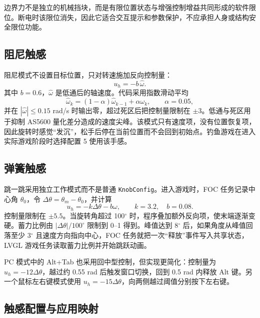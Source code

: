 边界力不是独立的机械挡块，而是有限位置状态与增强控制增益共同形成的软件限位。断电时该限位消失，因此它适合交互提示和参数保护，不应承担人身或结构安全限位功能。

\subsection{阻尼触感}

阻尼模式不设置目标位置，只对转速施加反向控制量：
\begin{equation}
u_h=-b\,\hat{\omega}.
\end{equation}
其中 $b=0.6$，$\hat{\omega}$ 是低通后的轴速度。代码采用指数滑动平均
\begin{equation}
\hat{\omega}_k=(1-\alpha)\hat{\omega}_{k-1}+\alpha\omega_k,
\qquad \alpha=0.05,
\end{equation}
并在 $|\hat{\omega}|\leq0.15$ rad/s 时输出零，超过死区后把控制量限制在 $\pm3$。低通与死区用于抑制 AS5600 量化差分造成的速度尖峰。该模式只有速度项，没有位置恢复项，因此旋转时感觉“发沉”，松手后停在当前位置而不会回到初始点。钓鱼游戏在进入实际游戏阶段时选择配置 5 使用该手感。

\subsection{弹簧触感}

跳一跳采用独立工作模式而不是普通 \texttt{KnobConfig}。进入游戏时，FOC 任务记录中心角 $\theta_0$，令 $\Delta\theta=\theta_m-\theta_0$，并计算
\begin{equation}
u_h=-k\Delta\theta-b\omega,
\qquad k=3.2,\quad b=0.08.
\end{equation}
控制量限制在 $\pm5.5$。当旋转角超过 100$^\circ$ 时，程序叠加额外反向项，使末端逐渐变硬。蓄力比例由 $|\Delta\theta|/100^\circ$ 限制到 0--1 得到。峰值达到 8$^\circ$ 后，如果角度从峰值回落至少 3$^\circ$ 且速度方向指向中心，FOC 任务就把一次“释放”事件写入共享状态，LVGL 游戏任务读取蓄力比例并开始跳跃动画。

PC 模式中的 Alt+Tab 也采用回中型控制，但实现更简化：控制量为 $u_h=-12\Delta\theta$，越过约 0.55 rad 后触发窗口切换，回到 0.5 rad 内释放 Alt 键。另一个鼠标左右键模式使用 $u_h=-15\Delta\theta$，向两侧越过阈值分别按下左右键。

\subsection{触感配置与应用映射}

